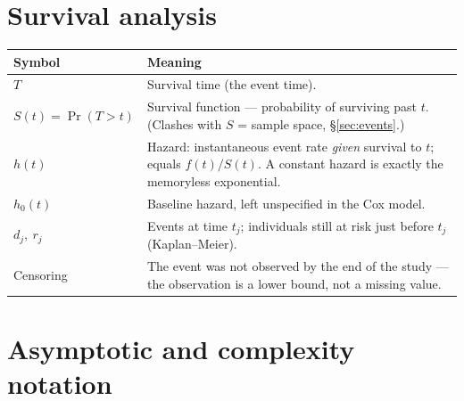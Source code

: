 \documentclass[10pt,letterpaper,onecolumn]{article}
\makeatletter
\newenvironment{symtab}
  {\begin{longtable}{@{}>{\raggedright\arraybackslash}p{0.26\textwidth}%
                       >{\raggedright\arraybackslash}p{0.70\textwidth}@{}}
   \toprule
   \textbf{Symbol} & \textbf{Meaning} \\
   \midrule
   \endhead
   \bottomrule
   \endfoot}
  {\end{longtable}}
\makeatother
\begin{document}
\section{Survival analysis}

\begin{symtab}
$T$ & Survival time (the event time). \\
$S(t) = \Pr(T>t)$ & Survival function — probability of surviving past $t$. (Clashes with $S$ = sample space, \S\ref{sec:events}.) \\
$h(t)$ & Hazard: instantaneous event rate \emph{given} survival to $t$; equals $f(t)/S(t)$. A constant hazard is exactly the memoryless exponential. \\
$h_0(t)$ & Baseline hazard, left unspecified in the Cox model. \\
$d_j,\ r_j$ & Events at time $t_j$; individuals still at risk just before $t_j$ (Kaplan--Meier). \\
Censoring & The event was not observed by the end of the study — the observation is a lower bound, not a missing value. \\
\end{symtab}

\section{Asymptotic and complexity notation}
\end{document}
